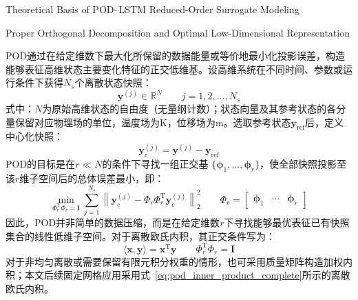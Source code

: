 {Theoretical Basis of POD--LSTM Reduced-Order Surrogate Modeling}
\label{sec:ch6_theoretical_basis}

{Proper Orthogonal Decomposition and Optimal Low-Dimensional Representation}
\label{subsec:ch6_pod_theory}

POD通过在给定维数下最大化所保留的数据能量或等价地最小化投影误差，构造能够表征高维状态主要变化特征的正交低维基\cite{berkoozProperOrthogonalDecomposition1993,holmesTurbulenceCoherentStructures1996}。设高维系统在不同时间、参数或运行条件下获得$N_s$个离散状态快照：
\begin{equation}
	\boldsymbol y^{(j)}\in\mathbb R^N
	\qquad j=1,2,\ldots,N_s
	\label{eq:ch6_general_snapshots}
\end{equation}
\noindent 式中：$N$为原始高维状态的自由度（无量纲计数）；状态向量及其参考状态的各分量保留对应物理场的单位，温度场为$\mathrm{K}$，位移场为$\mathrm{m}$。选取参考状态$\boldsymbol y_{\mathrm{ref}}$后，定义中心化快照：
\begin{equation}
	\boldsymbol y_c^{(j)}
	=
	\boldsymbol y^{(j)}-\boldsymbol y_{\mathrm{ref}}
	\label{eq:ch6_centered_snapshot}
\end{equation}
POD的目标是在$r\ll N$的条件下寻找一组正交基
$\{\boldsymbol\phi_1,\ldots,\boldsymbol\phi_r\}$，使全部快照投影至该$r$维子空间后的总体误差最小，即：
\begin{equation}
	\min_{\boldsymbol\varPhi_r^{\mathrm T}\boldsymbol\varPhi_r=\boldsymbol I}
	\sum_{j=1}^{N_s}
	\left\|
	\boldsymbol y_c^{(j)}
	-
	\boldsymbol\varPhi_r\boldsymbol\varPhi_r^{\mathrm T}
	\boldsymbol y_c^{(j)}
	\right\|_2^2
	\qquad
	\boldsymbol\varPhi_r=
	\begin{bmatrix}
		\boldsymbol\phi_1&\cdots&\boldsymbol\phi_r
	\end{bmatrix}
	\label{eq:ch6_pod_optimal_problem}
\end{equation}
因此，POD并非简单的数据压缩，而是在给定维数$r$下寻找能够最优表征已有快照集合的线性低维子空间。对于离散欧氏内积，其正交条件写为：
\begin{equation}
	\langle\boldsymbol x,\boldsymbol y\rangle
	=\boldsymbol x^{\mathrm T}\boldsymbol y
	\qquad
	\boldsymbol\varPhi_r^{\mathrm T}\boldsymbol\varPhi_r=\boldsymbol I
	\label{eq:pod_inner_product_complete}
\end{equation}
对于非均匀离散或需要保留有限元积分权重的情形，也可采用质量矩阵构造加权内积；本文后续固定网格应用采用式~\eqref{eq:pod_inner_product_complete}所示的离散欧氏内积。

